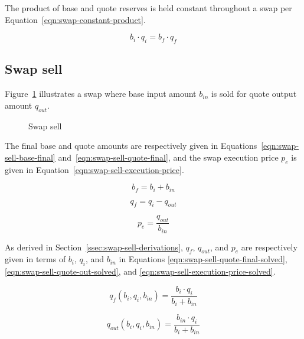 \documentclass[table, twocolumn]{article}
\begin{document}
The product of base and quote reserves is held constant throughout a swap per
Equation~\ref{eqn:swap-constant-product}.

\begin{equation}\label{eqn:swap-constant-product}
	b_i \cdot q_i = b_f \cdot q_f
\end{equation}

\subsection{Swap sell}\label{ssec:swap-sell}

Figure~\ref{fig:swap-sell} illustrates a swap where base input amount $b_{in}$ is sold
for quote output amount $q_{out}$.

\begin{figure}[!htb]
	\centering
	
	\caption{Swap sell}\label{fig:swap-sell}
\end{figure}

The final base and quote amounts are respectively given in
Equations~\ref{eqn:swap-sell-base-final} and~\ref{eqn:swap-sell-quote-final}, and the
swap execution price $p_e$ is given in Equation~\ref{eqn:swap-sell-execution-price}.

\begin{equation}\label{eqn:swap-sell-base-final}
	b_f = b_i + b_{in}
\end{equation}

\begin{equation}\label{eqn:swap-sell-quote-final}
	q_f = q_i - q_{out}
\end{equation}

\begin{equation}\label{eqn:swap-sell-execution-price}
	p_e = \frac{q_{out}}{b_{in}}
\end{equation}

As derived in Section~\ref{ssec:swap-sell-derivations}, $q_f$, $q_{out}$, and $p_e$ are
respectively given in terms of $b_i$, $q_i$, and $b_{in}$ in Equations
\ref{eqn:swap-sell-quote-final-solved}, \ref{eqn:swap-sell-quote-out-solved}, and
\ref{eqn:swap-sell-execution-price-solved}.

\begin{equation}\label{eqn:swap-sell-quote-final-solved}
	q_f(b_i, q_i, b_{in}) = \frac{b_i \cdot q_i}{b_i + b_{in}}
\end{equation}

\begin{equation}\label{eqn:swap-sell-quote-out-solved}
	q_{out} (b_i, q_i, b_{in}) = \frac{b_{in} \cdot q_i}{b_i + b_{in}}
\end{equation}
\end{document}
